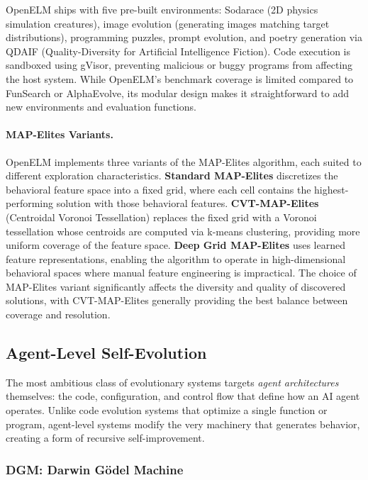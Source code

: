 OpenELM ships with five pre-built environments: Sodarace (2D physics simulation creatures), image evolution (generating images matching target distributions), programming puzzles, prompt evolution, and poetry generation via QDAIF (Quality-Diversity for Artificial Intelligence Fiction). Code execution is sandboxed using gVisor, preventing malicious or buggy programs from affecting the host system. While OpenELM's benchmark coverage is limited compared to FunSearch or AlphaEvolve, its modular design makes it straightforward to add new environments and evaluation functions.

\paragraph{MAP-Elites Variants.}
OpenELM implements three variants of the MAP-Elites algorithm, each suited to different exploration characteristics. \textbf{Standard MAP-Elites} discretizes the behavioral feature space into a fixed grid, where each cell contains the highest-performing solution with those behavioral features. \textbf{CVT-MAP-Elites} (Centroidal Voronoi Tessellation) replaces the fixed grid with a Voronoi tessellation whose centroids are computed via k-means clustering, providing more uniform coverage of the feature space. \textbf{Deep Grid MAP-Elites} uses learned feature representations, enabling the algorithm to operate in high-dimensional behavioral spaces where manual feature engineering is impractical. The choice of MAP-Elites variant significantly affects the diversity and quality of discovered solutions, with CVT-MAP-Elites generally providing the best balance between coverage and resolution.


\subsection{Agent-Level Self-Evolution}
\label{sec:ch4-agent-evo}

The most ambitious class of evolutionary systems targets \emph{agent architectures} themselves: the code, configuration, and control flow that define how an AI agent operates. Unlike code evolution systems that optimize a single function or program, agent-level systems modify the very machinery that generates behavior, creating a form of recursive self-improvement.

\subsubsection{DGM: Darwin G\"{o}del Machine}

